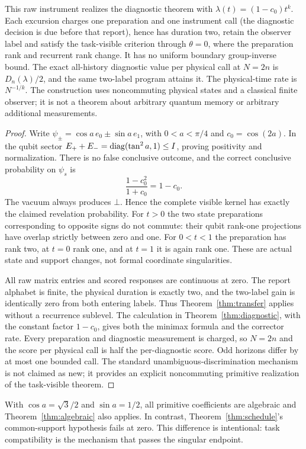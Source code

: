 \begin{theorem}\label{thm:quantum}
This raw instrument realizes the diagnostic theorem with $\lambda(t)=(1-c_0)t^k$. Each excursion charges one preparation and one instrument call (the diagnostic decision is due before that report), hence has duration two, retain the observer label and satisfy the task-visible criterion through $\theta=0$, where the preparation rank and recurrent rank change. It has no uniform boundary group-inverse bound. The exact all-history diagnostic value per physical call at $N=2n$ is $D_n(\lambda)/2$, and the same two-label program attains it. The physical-time rate is $N^{-1/k}$. The construction uses noncommuting physical states and a classical finite observer; it is not a theorem about arbitrary quantum memory or arbitrary additional measurements.
\end{theorem}
\begin{proof}
Write $\psi_\pm=\cos a\,e_0\pm\sin a\,e_1$, with $0<a<\pi/4$ and $c_0=\cos(2a)$. In the qubit sector $E_++E_-=\operatorname{diag}(\tan^2 a,1)\le I$, proving positivity and normalization. There is no false conclusive outcome, and the correct conclusive probability on $\psi_s$ is
\[
 \frac{1-c_0^2}{1+c_0}=1-c_0.
\]
The vacuum always produces $\bot$. Hence the complete visible kernel has exactly the claimed revelation probability. For $t>0$ the two state preparations corresponding to opposite signs do not commute: their qubit rank-one projections have overlap strictly between zero and one. For $0<t<1$ the preparation has rank two, at $t=0$ rank one, and at $t=1$ it is again rank one. These are actual state and support changes, not formal coordinate singularities.

All raw matrix entries and scored responses are continuous at zero. The report alphabet is finite, the physical duration is exactly two, and the two-label gain is identically zero from both entering labels. Thus Theorem~\ref{thm:transfer} applies without a recurrence sublevel. The calculation in Theorem~\ref{thm:diagnostic}, with the constant factor $1-c_0$, gives both the minimax formula and the corrector rate. Every preparation and diagnostic measurement is charged, so $N=2n$ and the score per physical call is half the per-diagnostic score. Odd horizons differ by at most one bounded call. The standard unambiguous-discrimination mechanism~\cite{ClarkeCheflesBarnettRiis} is not claimed as new; it provides an explicit noncommuting primitive realization of the task-visible theorem.
\end{proof}
With $\cos a=\sqrt3/2$ and $\sin a=1/2$, all primitive coefficients are algebraic and Theorem~\ref{thm:algebraic} also applies. In contrast, Theorem~\ref{thm:schedule}'s common-support hypothesis fails at zero. This difference is intentional: task compatibility is the mechanism that passes the singular endpoint.


